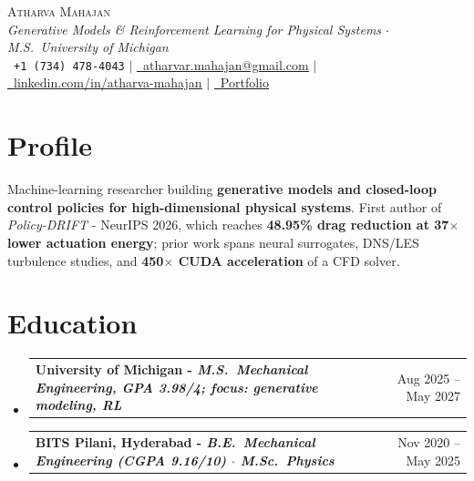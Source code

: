 \documentclass[letterpaper,10pt]{article}
\makeatletter
\newcommand{\resumeProjectHeading}[2]{
  \vspace{-2pt}\item
    \begin{tabular*}{1.0\textwidth}{l@{\extracolsep{\fill}}r}
      \small\textbf{\color{accent}#1} & {\small\color{gray}#2}\\
    \end{tabular*}\vspace{-6pt}
}
\newcommand{\resumeSubHeadingListStart}{\begin{itemize}[leftmargin=0in, label={}]}
\newcommand{\resumeSubHeadingListEnd}{\end{itemize}}
\makeatother
\begin{document}
\begin{center}
    {\Huge \scshape \color{accent} Atharva Mahajan} \\ \vspace{3pt}
    {\small \color{mid}\textit{Generative Models \& Reinforcement Learning for Physical Systems $\cdot$ M.S.\ University of Michigan}} \\ \vspace{4pt}
    \small
    \faPhone\ \texttt{+1 (734) 478-4043} \enspace\textcolor{mid}{$\mid$}\enspace
    \href{mailto:atharvar.mahajan@gmail.com}{\faEnvelope\ \underline{atharvar.mahajan@gmail.com}} \enspace\textcolor{mid}{$\mid$}\enspace
    \href{https://www.linkedin.com/in/atharva-mahajan-/}{\faLinkedin\ \underline{linkedin.com/in/atharva-mahajan}} \enspace\textcolor{mid}{$\mid$}\enspace
    \href{https://atsmah123.github.io/portfolio/}{\faLink\ \underline{Portfolio}}
\end{center}
\vspace{-8pt}
\section{Profile}
\vspace{2pt}
\small
Machine-learning researcher building \textbf{generative models and closed-loop control policies for high-dimensional physical systems}. First author of \textit{Policy-DRIFT} - NeurIPS 2026, which reaches \textbf{48.95\% drag reduction at 37$\times$ lower actuation energy}; prior work spans neural surrogates, DNS/LES turbulence studies, and \textbf{450$\times$ CUDA acceleration} of a CFD solver.
\vspace{2pt}
\section{Education}
\resumeSubHeadingListStart
  \resumeProjectHeading
    {University of Michigan \textnormal{-} \textit{M.S.\ Mechanical Engineering, GPA 3.98/4; focus: generative modeling, RL}}{Aug 2025 -- May 2027}
  \resumeProjectHeading
    {BITS Pilani, Hyderabad \textnormal{-} \textit{B.E.\ Mechanical Engineering (CGPA 9.16/10) $\cdot$ M.Sc.\ Physics}}{Nov 2020 -- May 2025}
\resumeSubHeadingListEnd
\vspace{2pt}
\end{document}
